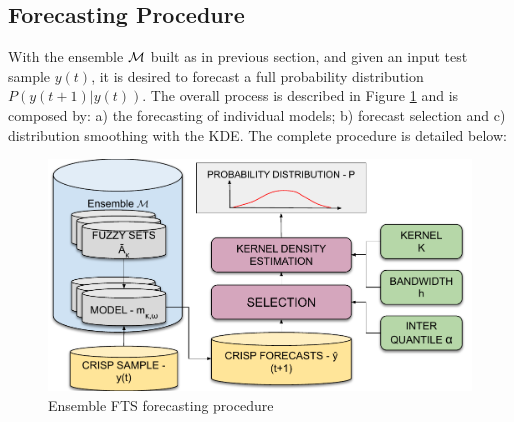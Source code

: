 %
\subsection{Forecasting Procedure}

With the ensemble $\mathcal{M}$ built as in previous section, and given an input test sample $y(t)$, it is desired to forecast a full probability distribution $P(y(t+1)|y(t))$. The overall process is described in Figure \ref{fig:ensemblefts_forecasting} and is composed by: a) the forecasting of individual models; b) forecast selection and c) distribution smoothing with the KDE. The complete procedure is detailed below:

\begin{figure}[htb]
\includegraphics[width=\textwidth]{figures/ensemblefts_forecasting.pdf}
\caption{Ensemble FTS forecasting procedure}
\label{fig:ensemblefts_forecasting}
\end{figure}

